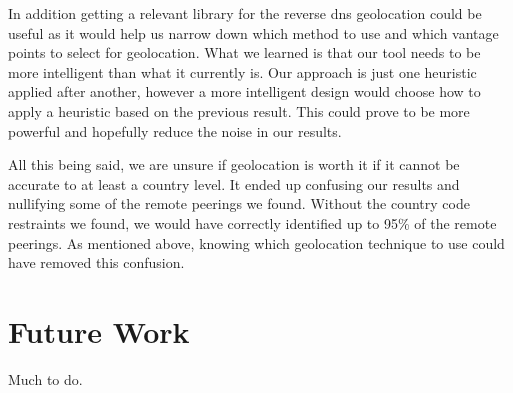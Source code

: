 \documentclass{acm_proc_article-sp}
\begin{document}
In addition getting a relevant library for the reverse dns geolocation could be useful as it would help
us narrow down which method to use and which vantage points to select for geolocation.
What we learned is that our tool needs to be more intelligent than what it currently is. Our approach is just one heuristic applied after another, however a more intelligent design would
choose how to apply a heuristic based on the previous result. This could prove to be more powerful and hopefully reduce the noise in our results.

All this being said, we are unsure if geolocation is worth it if it cannot be accurate to at least a country level. It ended up confusing our results and nullifying some of the remote peerings we found.
Without the country code restraints we found, we would have correctly identified up to 95\% of the remote peerings. As mentioned above, knowing which geolocation technique to use could have removed
this confusion.

\section{Future Work}
\label{sec:future}
Much to do.



\end{document}
